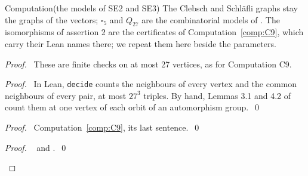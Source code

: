 \begin{namedresult}{Computation}{(the models of SE2 and SE3)}\label{comp:414-models}
 The Clebsch and Schl\"afli graphs stay the graphs of the vectors; $\square_5$ and $Q_{27}$ are
 the combinatorial models of . The isomorphisms of assertion 2
 are the certificates of Computation~\ref{comp:C9}, which carry their Lean names there; we
 repeat them here beside the parameters.
\end{namedresult}
\begin{proof}
 \pfsketch\ These are finite checks on at most 27 vertices, as for Computation C9.
 \begin{proof}\pf\ In Lean, \texttt{decide} counts the neighbours of every vertex and the common
  neighbours of every pair, at most $27^3$ triples. By hand, Lemmas 3.1 and 4.2 of
   count them at one vertex of each orbit of an automorphism
  group.~\qed\end{proof}
 \begin{proof}\pf\ Computation~\ref{comp:C9}, its last sentence.~\qed\end{proof}
 \qedstep
 \begin{proof}\pf\  and .~\qed\end{proof}
\end{proof}

